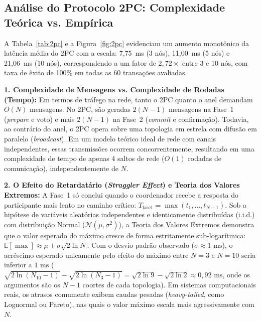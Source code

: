 \documentclass[conference]{IEEEtran}
\begin{document}
\subsection{Análise do Protocolo 2PC: Complexidade Teórica vs. Empírica}
A Tabela~\ref{tab:2pc} e a Figura~\ref{fig:2pc} evidenciam um aumento monotônico da latência média do 2PC com a escala: 7,75~ms (3 nós), 11,00~ms (5 nós) e 21,06~ms (10 nós), correspondendo a um fator de $2,72\times$ entre 3 e 10 nós, com taxa de êxito de 100\% em todas as 60 transações avaliadas.

\textbf{1. Complexidade de Mensagens vs. Complexidade de Rodadas (Tempo):} Em termos de tráfego na rede, tanto o 2PC quanto o anel demandam $O(N)$ mensagens. No 2PC, são geradas $2(N-1)$ mensagens na Fase~1 (\textit{prepare} e voto) e mais $2(N-1)$ na Fase~2 (\textit{commit} e confirmação). Todavia, ao contrário do anel, o 2PC opera sobre uma topologia em estrela com difusão em paralelo (\textit{broadcast}). Em um modelo teórico ideal de rede com canais independentes, essas transmissões ocorrem concorrentemente, resultando em uma complexidade de tempo de apenas 4 saltos de rede ($O(1)$ rodadas de comunicação), independentemente de $N$.

\textbf{2. O Efeito do Retardatário (\textit{Straggler Effect}) e Teoria dos Valores Extremos:} A Fase~1 só conclui quando o coordenador recebe a resposta do participante mais lento no caminho crítico: $T_{\text{fase1}} = \max(t_1, \dots, t_{N-1})$. Sob a hipótese de variáveis aleatórias independentes e identicamente distribuídas (i.i.d.) com distribuição Normal ($\mathcal{N}(\mu, \sigma^2)$), a Teoria dos Valores Extremos demonstra que o valor esperado do máximo cresce de forma estritamente sub-logarítmica: $\mathbb{E}[\max] \approx \mu + \sigma \sqrt{2 \ln N}$. Com o desvio padrão observado ($\sigma \approx 1\text{ ms}$), o acréscimo esperado unicamente pelo efeito do máximo entre $N=3$ e $N=10$ seria inferior a $1\text{ ms}$ ($\sqrt{2\ln(N_{10}-1)} - \sqrt{2\ln(N_3-1)} = \sqrt{2\ln 9} - \sqrt{2\ln 2} \approx 0{,}92\text{ ms}$, onde os argumentos são os $N-1$ coortes de cada topologia). Em sistemas computacionais reais, os atrasos comumente exibem caudas pesadas (\textit{heavy-tailed}, como Lognormal ou Pareto), nas quais o valor máximo escala mais agressivamente com $N$.
\end{document}
